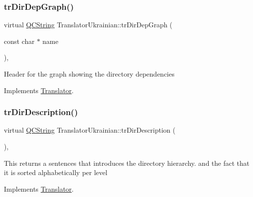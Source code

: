 \mbox{\label{class_translator_ukrainian_aedeb9f57322003252543a0298081f933}} 
\subsubsection{\texorpdfstring{trDirDepGraph()}{trDirDepGraph()}}
{\footnotesize\ttfamily virtual \mbox{\hyperlink{class_q_c_string}{Q\+C\+String}} Translator\+Ukrainian\+::tr\+Dir\+Dep\+Graph (\begin{DoxyParamCaption}\item[{const char $\ast$}]{name }\end{DoxyParamCaption})\hspace{0.3cm}{\ttfamily [inline]}, {\ttfamily [virtual]}}

Header for the graph showing the directory dependencies 

Implements \mbox{\hyperlink{class_translator}{Translator}}.

\mbox{\label{class_translator_ukrainian_a6acbb67a336a734ecac4257e0f0b8ccd}} 
\subsubsection{\texorpdfstring{trDirDescription()}{trDirDescription()}}
{\footnotesize\ttfamily virtual \mbox{\hyperlink{class_q_c_string}{Q\+C\+String}} Translator\+Ukrainian\+::tr\+Dir\+Description (\begin{DoxyParamCaption}{ }\end{DoxyParamCaption})\hspace{0.3cm}{\ttfamily [inline]}, {\ttfamily [virtual]}}

This returns a sentences that introduces the directory hierarchy. and the fact that it is sorted alphabetically per level 

Implements \mbox{\hyperlink{class_translator}{Translator}}.

\mbox{\label{class_translator_ukrainian_a7b89c731c6b93688846799891b2d9529}} 
